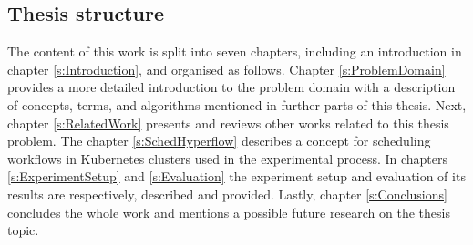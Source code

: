 \subsection{Thesis structure}\label{s:Introduction:Structure}


The content of this work is split into seven chapters, including an introduction in chapter \ref{s:Introduction}, and organised as follows.
Chapter \ref{s:ProblemDomain} provides a more detailed introduction to the problem domain with a description of concepts, terms, and algorithms mentioned in further parts of this thesis.
Next, chapter \ref{s:RelatedWork} presents and reviews other works related to this thesis problem.
The chapter \ref{s:SchedHyperflow} describes a concept for scheduling workflows in Kubernetes clusters used in the experimental process.
In chapters \ref{s:ExperimentSetup} and \ref{s:Evaluation} the experiment setup and evaluation of its results are respectively, described and provided.
Lastly, chapter \ref{s:Conclusions} concludes the whole work and mentions a possible future research on the thesis topic.
